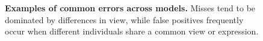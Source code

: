 \begin{figure}[ht]
  \centering {} 
  \caption[]{{\bf Examples of common errors across models.} Misses tend to be
    dominated by differences in view, while false positives frequently occur when
    different individuals share a common view or expression. }
  \label{fig:error_examples}
\end{figure}




